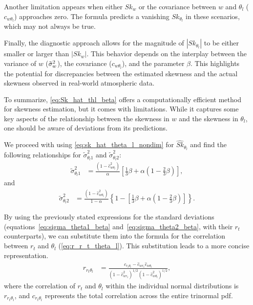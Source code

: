 Another limitation appears when either $Sk_w$
or the covariance between $w$ and $\theta_l$ ($c_{w \theta_l}$) approaches zero.
The formula predicts a vanishing $Sk_{\theta_l}$ in these scenarios,
which may not always be true.

Finally, the diagnostic approach allows for the magnitude of $\left| Sk_{\theta_l} \right|$
to be either smaller or larger than $\left| Sk_w \right|$.
This behavior depends on the interplay between the variance of $w$ (${\tilde{\sigma}_w}^2$),
the covariance ($c_{w \theta_l}$),
and the parameter $\beta$.
This highlights the potential for discrepancies between the estimated skewness
and the actual skewness observed in real-world atmospheric data.

To summarize, \cref{eq:Sk_hat_thl_beta} offers a computationally efficient method for skewness estimation,
but it comes with limitations.
While it captures some key aspects of the relationship between the skewness in $w$
and the skewness in $\theta_l$,
one should be aware of deviations from its predictions.

We proceed with using \cref{eq:sk_hat_theta_l_nondim} for $\widehat{Sk}_{\theta_l}$
and find the following relationships\cite{larson2005using}
for $\tilde{\sigma}_{\theta_l 1}^2$ and $\tilde{\sigma}_{\theta_l 2}^2$:
\begin{align}
    \label{eq:sigma_theta1_beta}
    \tilde{\sigma}_{\theta_l 1}^2
    &= \frac{\left(1 - \widehat{c}_{w \theta_l}^2\right)}{\alpha} \left[\frac{1}{3} \beta + \alpha \left(1 - \frac{2}{3} \beta\right)\right],
\end{align}
and
\begin{align}
    \label{eq:sigma_theta2_beta}
    \tilde{\sigma}_{\theta_l 2}^2
    &= \frac{\left(1 - \widehat{c}_{w \theta_l}^2\right)} {1 - \alpha} \left\{1 - \left[\frac{1}{3}\beta + \alpha \left(1 - \frac{2}{3} \beta \right)\right]\right\}.
\end{align}

By using the previously stated expressions for the standard deviations
(equations~\eqref{eq:sigma_theta1_beta} and~\eqref{eq:sigma_theta2_beta},
with their $r_t$ counterparts),
we can substitute them into the formula for the correlation between
$r_t$ and $\theta_l$ (\cref{eq:r_r_t_theta_l}).
This substitution leads to a more concise representation.
\begin{align}
    \label{eq:r_r_t_theta_l_beta}
    r_{r_t \theta_l}
    &= \frac{c_{r_t \theta_l} - \widehat{c}_{w r_t} \widehat{c}_{w \theta_l}}
    {\left(1 - \widehat{c}_{w r_t}^2\right)^{1/2} \left(1 - \widehat{c}_{w \theta_l}^2\right)^{1/2}},
\end{align}
where the correlation of $r_t$ and $\theta_l$ within the individual normal distributions is $r_{r_t \theta_l}$,
and $c_{r_t \theta_l}$ represents the total correlation across the entire trinormal \gls{pdf}.

